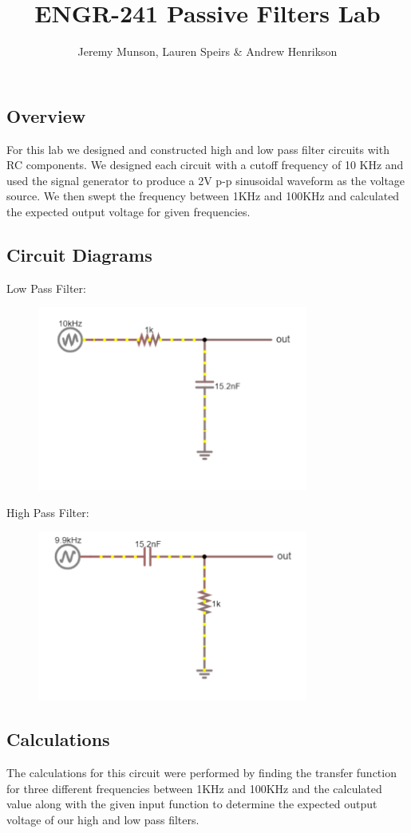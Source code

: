 \documentclass[11pt]{article}
\title{ENGR-241 Passive Filters Lab}
\author{Jeremy Munson, Lauren Speirs \& Andrew Henrikson}
\begin{document}
	\maketitle
	\subsection*{Overview}
	For this lab we designed and  constructed high and low pass filter circuits with RC components. We designed each circuit with a cutoff frequency of 10 KHz and used the signal generator to produce a 2V p-p sinusoidal waveform as the voltage source. We then swept the frequency between 1KHz and 100KHz and calculated the expected output voltage for given frequencies.
	\subsection*{Circuit Diagrams}
	Low Pass Filter: 
	\begin{figure}[H]
		\centering
		\includegraphics[width=3.5in]{images/low diagram.PNG}
	\end{figure}
	High Pass Filter:
	\begin{figure}[H]
		\centering
		\includegraphics[width=3.5in]{images/high diagram.PNG}
	\end{figure}
	
	\subsection*{Calculations}
	The calculations for this circuit were performed by finding the transfer function for three different frequencies between 1KHz and 100KHz and the calculated value along with the given input function to determine the expected output voltage of our high and low pass filters.
\end{document}

